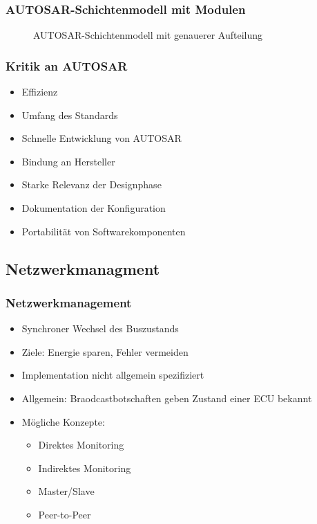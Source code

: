 \documentclass[]{beamer}
\newcommand{\inputImage}[1]{}
\begin{document}
\begin{frame}
\frametitle{AUTOSAR-Schichtenmodell mit Modulen}
    \begin{figure}[ht]
        \centering
        \resizebox{\linewidth}{!}{\inputImage{autosar_refined_layer.dia}}
        \caption{AUTOSAR-Schichtenmodell mit genauerer Aufteilung}
        \label{fig:autosar_refined_layer}
    \end{figure}
\end{frame}

\begin{frame}
\frametitle{Kritik an AUTOSAR}
    \begin{itemize}
        \item Effizienz
        \item Umfang des Standards
        \item Schnelle Entwicklung von AUTOSAR
        \item Bindung an Hersteller
        \item Starke Relevanz der Designphase
        \item Dokumentation der Konfiguration
        \item Portabilität von Softwarekomponenten
    \end{itemize}
\end{frame}




\subsection{Netzwerkmanagment}
\begin{frame}
\frametitle{Netzwerkmanagement}
    \begin{itemize}
        \item Synchroner Wechsel des Buszustands
        \item Ziele: Energie sparen, Fehler vermeiden
        \item Implementation nicht allgemein spezifiziert
        \item Allgemein: Braodcastbotschaften geben Zustand einer ECU bekannt
        \item Mögliche Konzepte:
        \begin{itemize}
            \item Direktes Monitoring
            \item Indirektes Monitoring
            \item Master/Slave
            \item Peer-to-Peer
        \end{itemize}
    \end{itemize}
\end{frame}
\end{document}
